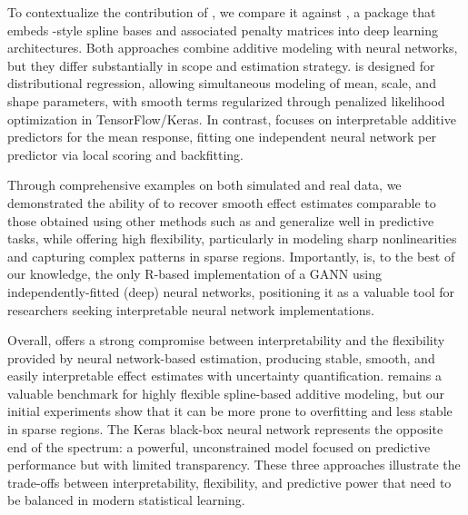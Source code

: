 To contextualize the contribution of , we compare it against , a package that embeds -style spline bases and associated penalty matrices into deep learning architectures. Both approaches combine additive modeling with neural networks, but they differ substantially in scope and estimation strategy.  is designed for distributional regression, allowing simultaneous modeling of mean, scale, and shape parameters, with smooth terms regularized through penalized likelihood optimization in TensorFlow/Keras. In contrast,  focuses on interpretable additive predictors for the mean response, fitting one independent neural network per predictor via local scoring and backfitting.

Through comprehensive examples on both simulated and real data, we demonstrated the ability of  to recover smooth effect estimates comparable to those obtained using other methods such as  and generalize well in predictive tasks, while offering high flexibility, particularly in modeling sharp nonlinearities and capturing complex patterns in sparse regions. Importantly,  is, to the best of our knowledge, the only \textsf{R}-based implementation of a GANN using independently-fitted (deep) neural networks, positioning it as a valuable tool for researchers seeking interpretable neural network implementations.

Overall,  offers a strong compromise between interpretability and the flexibility provided by neural network-based estimation, producing stable, smooth, and easily interpretable effect estimates with uncertainty quantification.  remains a valuable benchmark for highly flexible spline-based additive modeling, but our initial experiments show that it can be more prone to overfitting and less stable in sparse regions. The Keras black-box neural network represents the opposite end of the spectrum: a powerful, unconstrained model focused on predictive performance but with limited transparency. These three approaches illustrate the trade-offs between interpretability, flexibility, and predictive power that need to be balanced in modern statistical learning.

